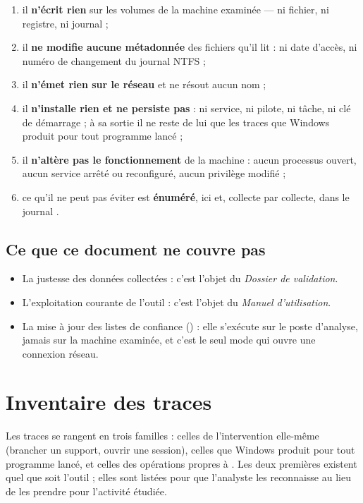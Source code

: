 \documentclass[11pt,a4paper,oneside]{report}
\begin{document}
\begin{enumerate}
  \item il \textbf{n'écrit rien} sur les volumes de la machine examinée — ni
        fichier, ni registre, ni journal ;
  \item il \textbf{ne modifie aucune métadonnée} des fichiers qu'il lit : ni
        date d'accès, ni numéro de changement du journal NTFS ;
  \item il \textbf{n'émet rien sur le réseau} et ne résout aucun nom ;
  \item il \textbf{n'installe rien et ne persiste pas} : ni service, ni pilote,
        ni tâche, ni clé de démarrage ; à sa sortie il ne reste de lui que
        les traces que Windows produit pour tout programme lancé ;
  \item il \textbf{n'altère pas le fonctionnement} de la machine : aucun
        processus ouvert, aucun service arrêté ou reconfiguré, aucun privilège
        modifié ;
  \item ce qu'il ne peut pas éviter est \textbf{énuméré}, ici et, collecte par
        collecte, dans le journal
        .
\end{enumerate}

\section{Ce que ce document ne couvre pas}

\begin{itemize}
  \item La justesse des données collectées : c'est l'objet du \emph{Dossier de
        validation}.
  \item L'exploitation courante de l'outil : c'est l'objet du \emph{Manuel
        d'utilisation}.
  \item La mise à jour des listes de confiance () : elle
        s'exécute sur le poste d'analyse, jamais sur la machine examinée, et
        c'est le seul mode qui ouvre une connexion réseau.
\end{itemize}

\chapter{Inventaire des traces}\label{ch:traces}

Les traces se rangent en trois familles : celles de l'intervention elle-même
(brancher un support, ouvrir une session), celles que Windows produit pour tout
programme lancé, et celles des opérations propres à \wac{}. Les deux premières
existent quel que soit l'outil ; elles sont listées pour que l'analyste les
reconnaisse au lieu de les prendre pour l'activité étudiée.
\end{document}

